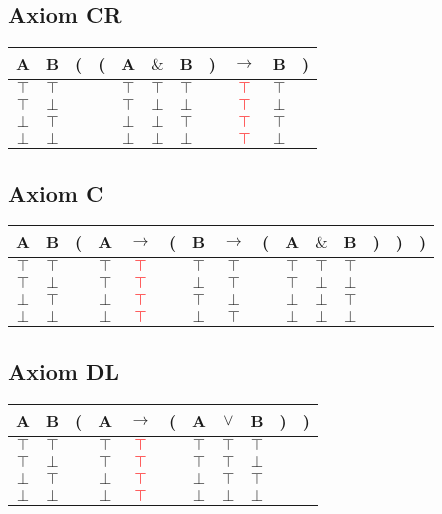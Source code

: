 \documentclass{article}
\begin{document}
\subsection{Axiom CR}
\begin{tabular}{@{ }c@{ }@{ }c | c@{}@{}c@{}@{ }c@{ }@{ }c@{ }@{ }c@{ }@{}c@{}@{ }c@{ }@{ }c@{ }@{}c@{ }}
A & B & ( & ( & A & $\&$ & B & ) & $\rightarrow$ & B & )\\
\hline 
$\top$ & $\top$ &  &  & $\top$ & $\top$ & $\top$ &  & \textcolor{red}{$\top$} & $\top$ & \\
$\top$ & $\bot$ &  &  & $\top$ & $\bot$ & $\bot$ &  & \textcolor{red}{$\top$} & $\bot$ & \\
$\bot$ & $\top$ &  &  & $\bot$ & $\bot$ & $\top$ &  & \textcolor{red}{$\top$} & $\top$ & \\
$\bot$ & $\bot$ &  &  & $\bot$ & $\bot$ & $\bot$ &  & \textcolor{red}{$\top$} & $\bot$ & \\
\end{tabular}
\subsection{Axiom C}
\begin{tabular}{@{ }c@{ }@{ }c | c@{}@{ }c@{ }@{ }c@{ }@{}c@{}@{ }c@{ }@{ }c@{ }@{}c@{}@{ }c@{ }@{ }c@{ }@{ }c@{ }@{}c@{}@{}c@{}@{}c@{ }}
A & B & ( & A & $\rightarrow$ & ( & B & $\rightarrow$ & ( & A & $\&$ & B & ) & ) & )\\
\hline 
$\top$ & $\top$ &  & $\top$ & \textcolor{red}{$\top$} &  & $\top$ & $\top$ &  & $\top$ & $\top$ & $\top$ &  &  & \\
$\top$ & $\bot$ &  & $\top$ & \textcolor{red}{$\top$} &  & $\bot$ & $\top$ &  & $\top$ & $\bot$ & $\bot$ &  &  & \\
$\bot$ & $\top$ &  & $\bot$ & \textcolor{red}{$\top$} &  & $\top$ & $\bot$ &  & $\bot$ & $\bot$ & $\top$ &  &  & \\
$\bot$ & $\bot$ &  & $\bot$ & \textcolor{red}{$\top$} &  & $\bot$ & $\top$ &  & $\bot$ & $\bot$ & $\bot$ &  &  & \\
\end{tabular}
\subsection{Axiom DL}
\begin{tabular}{@{ }c@{ }@{ }c | c@{}@{ }c@{ }@{ }c@{ }@{}c@{}@{ }c@{ }@{ }c@{ }@{ }c@{ }@{}c@{}@{}c@{ }}
A & B & ( & A & $\rightarrow$ & ( & A & $\lor$ & B & ) & )\\
\hline 
$\top$ & $\top$ &  & $\top$ & \textcolor{red}{$\top$} &  & $\top$ & $\top$ & $\top$ &  & \\
$\top$ & $\bot$ &  & $\top$ & \textcolor{red}{$\top$} &  & $\top$ & $\top$ & $\bot$ &  & \\
$\bot$ & $\top$ &  & $\bot$ & \textcolor{red}{$\top$} &  & $\bot$ & $\top$ & $\top$ &  & \\
$\bot$ & $\bot$ &  & $\bot$ & \textcolor{red}{$\top$} &  & $\bot$ & $\bot$ & $\bot$ &  & \\
\end{tabular}
\end{document}
